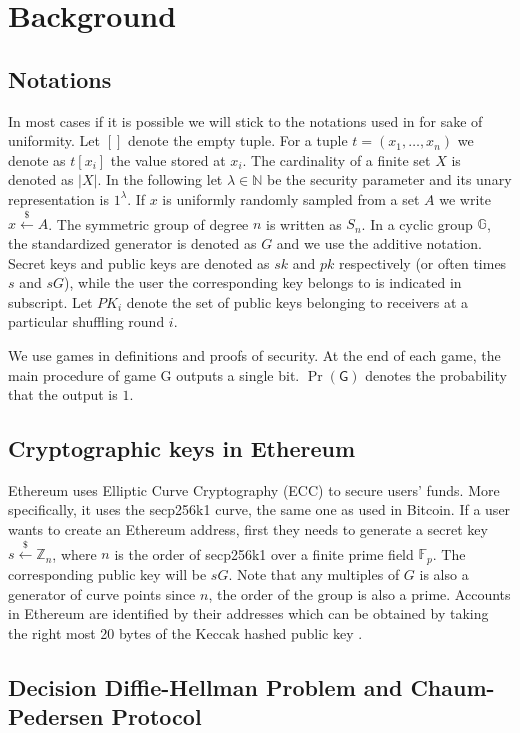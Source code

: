 \documentclass[a4paper]{article}
\theoremstyle{definition}
\begin{document}
\section{Background}
\subsection{Notations}
In most cases if it is possible we will stick to the notations used in \cite{meiklejohn2018mobius} for sake of uniformity. 
Let $[]$ denote the empty tuple. For a tuple $t=(x_1,\dots,x_n)$ we denote as $t[x_i]$ the value stored at $x_{i}$. The cardinality of a finite set $X$ is denoted as $|X|$. In the following let $\lambda \in \mathbb{N}$ be the security parameter and its unary representation is $1^{\lambda}$. If $x$ is uniformly randomly sampled from a set $A$ we write $x\stackrel{\$}{\leftarrow}A$. The symmetric group of degree $n$ is written as ${S}_n$. In a cyclic group $\mathbb{G}$, the standardized generator is denoted as $G$ and we use the additive notation. Secret keys and public keys are denoted as $sk$ and $pk$ respectively (or often times $s$ and $sG$), while the user the corresponding key belongs to is indicated in subscript. Let $PK_{i}$ denote the set of public keys belonging to receivers at a particular shuffling round $i$.

We use games in definitions and proofs of security. At the end of each game, the main procedure of game \textsf{G} outputs a single bit. $\Pr(\textsf{G})$ denotes the probability that the output is $1$.
\subsection{Cryptographic keys in Ethereum}
Ethereum uses Elliptic Curve Cryptography (ECC) to secure users' funds. More specifically, it uses the secp256k1 curve, the same one as used in Bitcoin. If a user wants to create an Ethereum address, first they needs to generate a secret key  $s\stackrel{\$}{\leftarrow}\mathbb{Z}_n$, where $n$ is the order of secp256k1 over a finite prime field $\mathbb{F}_{p}$. The corresponding public key will be $sG$. Note that any multiples of $G$ is also a generator of curve points since $n$, the order of the group is also a prime. Accounts in Ethereum are identified by their addresses which can be obtained by taking the right most 20 bytes of the Keccak hashed public key \cite{wood2014ethereum}. 
    
\subsection{Decision Diffie-Hellman Problem and Chaum-Pedersen Protocol}
\end{document}

